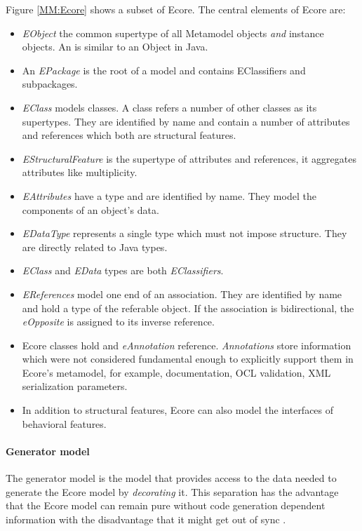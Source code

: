 Figure \ref{MM:Ecore} shows a subset of Ecore.  The central elements of Ecore are:\\
\begin{itemize}
	\item \emph{EObject} the common supertype of all Metamodel objects \emph{and} instance objects. An  is similar to an Object in Java.
	\item An \emph{EPackage} is the root of a model and contains EClassifiers and subpackages.
	\item \emph{EClass} models classes. A class refers a number of other classes as its supertypes. They are identified by name and contain a number of attributes and references which both are structural features.
	\item \emph{EStructuralFeature} is the supertype of attributes and references, it aggregates attributes like multiplicity.
	\item \emph{EAttributes} have a type and are identified by name. They model the components of an object's data.
	\item \emph{EDataType} represents a single type which must not impose structure. They are directly related to Java types.
	\item \emph{EClass} and \emph{EData} types are both \emph{EClassifiers}.
	\item \emph{EReferences} model one end of an association. They are identified by name and hold a type of the referable object. If the association is bidirectional, the \emph{eOpposite} is assigned to its inverse reference. \cite{EMF2nd}
	\item Ecore classes hold and \emph{eAnnotation} reference. \emph{Annotations} store information which were not considered fundamental enough to explicitly support them in Ecore's metamodel, for example, documentation, OCL validation, XML serialization parameters. \cite{EMP}
	\item In addition to structural features, Ecore can also model the interfaces of behavioral features.
\end{itemize}

\paragraph{Generator model}
The generator model is the model that provides access to the data needed to generate the Ecore model by \emph{decorating} it. This separation has the advantage that the Ecore model can remain pure without code generation dependent information with the disadvantage that it might get out of sync \cite{EMF2nd}.


